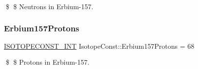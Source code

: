 \$ \$ Neutrons in Erbium-\/157. \mbox{\label{group___isotope_const-_erbium-_er157_ga5e12f8ff1ea23f604121958d72398123}} 
\subsubsection{\texorpdfstring{Erbium157\+Protons}{Erbium157Protons}}
{\footnotesize\ttfamily \mbox{\hyperlink{group___isotope_const-_macros_ga5f18360b3e99483a35c32d789e62621c}{I\+S\+O\+T\+O\+P\+E\+C\+O\+N\+S\+T\+\_\+\+I\+NT}} Isotope\+Const\+::\+Erbium157\+Protons = 68}

\$ \$ Protons in Erbium-\/157. 